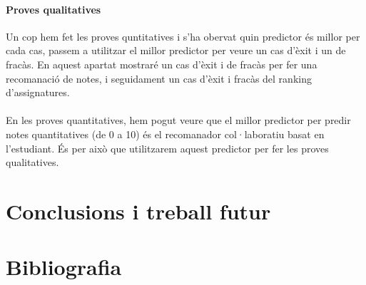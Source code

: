 \documentclass[12pt,a4paper,catalan]{article}
\begin{document}
\paragraph{Proves qualitatives}
Un cop hem fet les proves quntitatives i s'ha obervat quin predictor és millor per cada cas, passem a utilitzar el millor predictor per veure un cas d'èxit i un de fracàs. En aquest apartat mostraré un cas d'èxit i de fracàs per fer una recomanació de notes, i seguidament un cas d'èxit i fracàs del ranking d'assignatures.
\\
\\
En les proves quantitatives, hem pogut veure que el millor predictor per predir notes quantitatives (de 0 a 10) és el recomanador col·laboratiu basat en l'estudiant. És per això que utilitzarem aquest predictor per fer les proves qualitatives.






\newpage
\section{Conclusions i treball futur}
\newpage
\section{Bibliografia}
\end{document}
